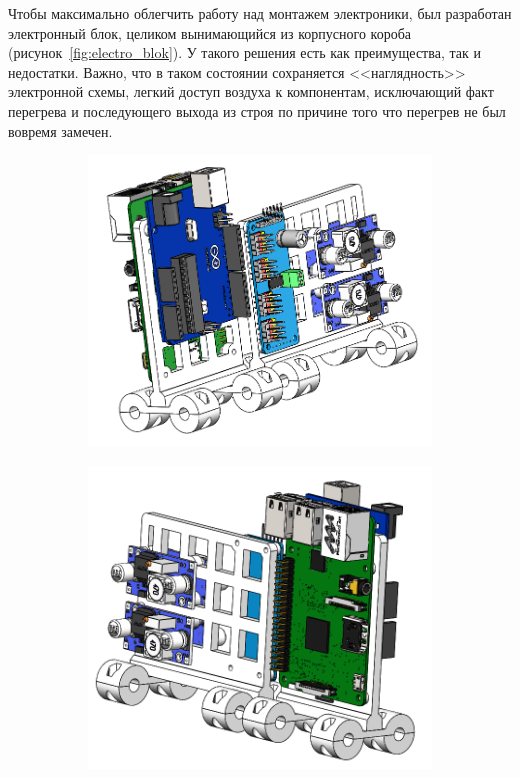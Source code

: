 Чтобы максимально облегчить работу над монтажем электроники, был разработан электронный блок, целиком вынимающийся из корпусного короба (рисунок~\ref{fig:electro_blok}). У такого решения есть как преимущества, так и недостатки. Важно, что в таком состоянии сохраняется <<наглядность>> электронной схемы, легкий доступ воздуха к компонентам, исключающий факт перегрева и последующего выхода из строя по причине того что перегрев не был вовремя замечен.
\begin{figure}[ht]
    \centering
    \begin{subfigure}[b]{0.45\textwidth}    
        \centering
        \includegraphics[scale=0.45]{chapter_mechanics_construction/figure17.png}
        \caption{}
    \end{subfigure}
    \begin{subfigure}[b]{0.45\textwidth}
        \centering
        \includegraphics[scale=0.45]{chapter_mechanics_construction/figure18.png}
        \caption{}
    \end{subfigure}
     

\end{figure}
